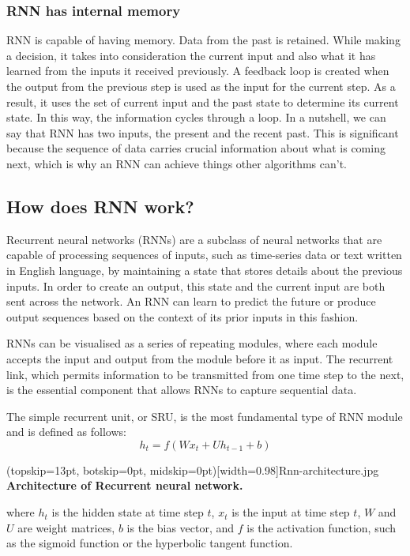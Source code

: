 \documentclass{ieeeaccess}
\begin{document}
\subsubsection{RNN has internal memory}
RNN is capable of having memory. Data from the past is retained. While making a decision, it takes into consideration the current input and also what it has learned from the inputs it received previously. A feedback loop is created when the output from the previous step is used as the input for the current step. As a result, it uses the set of current input and the past state to determine its current state. In this way, the information cycles through a loop. In a nutshell, we can say that RNN has two inputs, the present and the recent past. This is significant because the sequence of data carries crucial information about what is coming next, which is why an RNN can achieve things other algorithms can’t.

\subsection{How does RNN work?}
Recurrent neural networks (RNNs) are a subclass of neural networks that are capable of processing sequences of inputs, such as time-series data or text written in English language, by maintaining a state that stores details about the previous inputs. In order to create an output, this state and the current input are both sent across the network. An RNN can learn to predict the future or produce output sequences based on the context of its prior inputs in this fashion.

RNNs can be visualised as a series of repeating modules, where each module accepts the input and output from the module before it as input. The recurrent link, which permits information to be transmitted from one time step to the next, is the essential component that allows RNNs to capture sequential data.

The simple recurrent unit, or SRU, is the most fundamental type of RNN module and is defined as follows:
\[ h_t=f(Wx_t+Uh_{t-1}+b )\]

\Figure[t!](topskip=13pt, botskip=0pt, midskip=0pt)[width=0.98\linewidth]{Rnn-architecture.jpg}
{ \textbf{Architecture of Recurrent neural network.}\label{fig2}}

where \(h_t\) is the hidden state at time step \(t\), \({x_t}\) is the input at time step \(t\), \(W\) and \(U\) are weight matrices, \(b\) is the bias vector, and \(f\) is the activation function, such as the sigmoid function or the hyperbolic tangent function.
\end{document}
